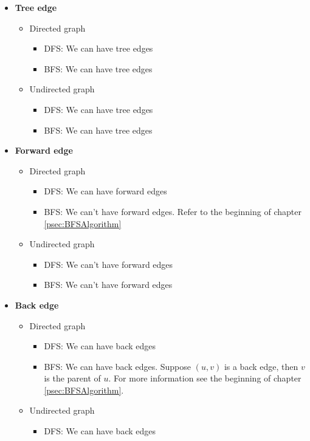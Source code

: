 \documentclass{book}
\begin{document}
	\begin{itemize}
		\item \textbf{Tree edge}
		\begin{itemize}
			\item Directed graph
			\begin{itemize}
				\item DFS: We can have tree edges
				\item BFS: We can have tree edges
			\end{itemize}
			\item Undirected graph
			\begin{itemize}
				\item DFS: We can have tree edges
				\item BFS: We can have tree edges
			\end{itemize}				
		\end{itemize}
		\item \textbf{Forward edge}
		\begin{itemize}
			\item Directed graph
			\begin{itemize}
				\item DFS: We can have forward edges
				\item BFS: We can't have forward edges. Refer to the beginning of chapter \ref{psec:BFSAlgorithm}
			\end{itemize}
			\item Undirected graph
			\begin{itemize}
				\item DFS: We can't have forward edges
				\item BFS: We can't have forward edges
			\end{itemize}				
		\end{itemize}
		\item \textbf{Back edge}
		\begin{itemize}
			\item Directed graph
			\begin{itemize}
				\item DFS: We can have back edges
				\item BFS: We can have back edges. Suppose $(u, v)$ is a back edge, then $v$ is the parent of $u$. For more information see the beginning of chapter \ref{psec:BFSAlgorithm}.
			\end{itemize}
			\item Undirected graph
			\begin{itemize}
				\item DFS: We can have back edges

\end{itemize}
\end{itemize}
\end{itemize}
\end{document}
